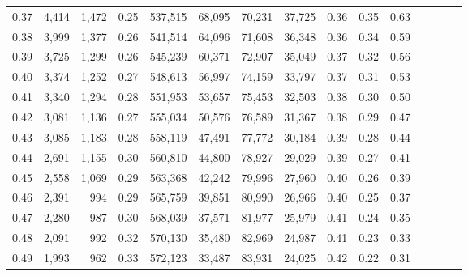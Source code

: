 \begin{tabular}{rrrcrrrrrrrrrrr}
0.37 &   4,414 &  1,472 &                                       0.25 &  537,515 &   68,095 &   70,231 &   37,725 &  0.36 &  0.35 &                         0.63 \\
0.38 &   3,999 &  1,377 &                                       0.26 &  541,514 &   64,096 &   71,608 &   36,348 &  0.36 &  0.34 &                         0.59 \\
0.39 &   3,725 &  1,299 &                                       0.26 &  545,239 &   60,371 &   72,907 &   35,049 &  0.37 &  0.32 &                         0.56 \\
0.40 &   3,374 &  1,252 &                                       0.27 &  548,613 &   56,997 &   74,159 &   33,797 &  0.37 &  0.31 &                         0.53 \\
0.41 &   3,340 &  1,294 &                                       0.28 &  551,953 &   53,657 &   75,453 &   32,503 &  0.38 &  0.30 &                         0.50 \\
0.42 &   3,081 &  1,136 &                                       0.27 &  555,034 &   50,576 &   76,589 &   31,367 &  0.38 &  0.29 &                         0.47 \\
0.43 &   3,085 &  1,183 &                                       0.28 &  558,119 &   47,491 &   77,772 &   30,184 &  0.39 &  0.28 &                         0.44 \\
0.44 &   2,691 &  1,155 &                                       0.30 &  560,810 &   44,800 &   78,927 &   29,029 &  0.39 &  0.27 &                         0.41 \\
0.45 &   2,558 &  1,069 &                                       0.29 &  563,368 &   42,242 &   79,996 &   27,960 &  0.40 &  0.26 &                         0.39 \\
0.46 &   2,391 &    994 &                                       0.29 &  565,759 &   39,851 &   80,990 &   26,966 &  0.40 &  0.25 &                         0.37 \\
0.47 &   2,280 &    987 &                                       0.30 &  568,039 &   37,571 &   81,977 &   25,979 &  0.41 &  0.24 &                         0.35 \\
0.48 &   2,091 &    992 &                                       0.32 &  570,130 &   35,480 &   82,969 &   24,987 &  0.41 &  0.23 &                         0.33 \\
0.49 &   1,993 &    962 &                                       0.33 &  572,123 &   33,487 &   83,931 &   24,025 &  0.42 &  0.22 &                         0.31 \\

\end{tabular}
